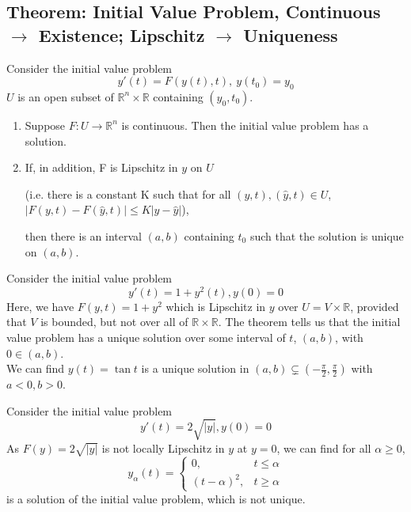 \documentclass[11pt]{elegantbook}
\begin{document}
\subsection{Theorem: Initial Value Problem, Continuous $\rightarrow$ Existence; Lipschitz $\rightarrow$ Uniqueness}
\begin{theorem}
    Consider the initial value problem $$y'(t)=F(y(t), t),\ y(t_0)=y_0$$
    $U$ is an open subset of $\mathbb{R}^n\times \mathbb{R}$ containing $(y_0,t_0)$.
    \begin{enumerate}
        \item Suppose $F : U \rightarrow \mathbb{R}^n$ is continuous. Then the initial value problem has a solution.
        \item If, in addition, F is Lipschitz in $y$ on $U$
        
        (i.e. there is a constant K such that for all $(y,t),(\hat{y},t)\in U$, $|F(y,t)-F(\hat{y},t)|\leq K|y-\hat{y}|$),
        
        then there is an interval $(a, b)$ containing $t_0$ such that the solution is unique on $(a, b)$.
    \end{enumerate}
\end{theorem}

\begin{example}
    Consider the initial value problem $$y'(t) = 1 + y^2(t), y(0) = 0$$
    Here, we have $F(y, t) = 1 + y^2$ which is Lipschitz in $y$ over $U = V \times \mathbb{R}$, provided that $V$ is bounded, but not over all of $\mathbb{R} \times \mathbb{R}$. The theorem tells us that the initial value problem has a unique solution over some interval of $t$, $(a, b)$, with $0 \in (a, b)$.\\
    We can find $y(t)=\tan t$ is a unique solution in $(a,b)\subsetneq (-\frac{\pi}{2},\frac{\pi}{2})$ with $a<0,b>0$.
\end{example}

\begin{example}
    Consider the initial value problem $$y'(t) = 2\sqrt{|y|}, y(0) = 0$$
    As $F(y)=2\sqrt{|y|}$ is not locally Lipschitz in $y$ at $y = 0$, we can find for all $\alpha\geq 0$, $$y_\alpha(t)=\left\{\begin{matrix}
        0,&t\leq \alpha\\
        (t-\alpha)^2,&t\geq \alpha
    \end{matrix}\right.$$ is a solution of the initial value problem, which is not unique.
\end{example}
\end{document}
